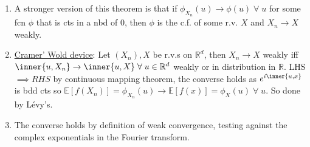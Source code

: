 \begin{remark}
	\begin{enumerate}
		\item A stronger version of this theorem is that if $\phi_{X_n}(u) \to \phi(u) \; \forall \; u$ for some fcn $\phi$ that is cts in a nbd of $0$, then $\phi$ is the c.f. of some r.v. $X$ and $X_n \to X$ weakly.
		\item \underline{Cramer' Wold device}: Let $(X_n), X$ be r.v.s on $\mathbb{R}^d$, then $X_n \to X$ weakly iff $\inner{u, X_n} \to \inner{u, X} \; \forall \; u \in \mathbb{R}^d$ weakly or in distribution in $\mathbb{R}$. LHS $\implies RHS$ by continuous mapping theorem, the converse holds as $e^{i \inner{u, x}}$ is bdd cts so $\mathbb{E}[f(X_n)] = \phi_{X_n}(u) \to \mathbb{E}[f(x)] = \phi_X(u) \; \forall \; u$. So done by L\'evy's.
		\item The converse holds by definition of weak convergence, testing against the complex exponentials in the Fourier transform.
	\end{enumerate}
\end{remark}

